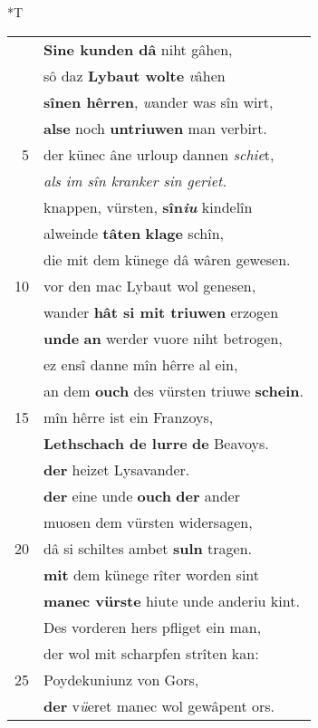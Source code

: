 \documentclass[8pt,a4paper,notitlepage]{article}
\begin{document}
\begin{table}[ht]
\begin{minipage}[t]{0.5\linewidth}
\end{minipage}
\hspace{0.5cm}
\begin{minipage}[t]{0.5\linewidth}
\small
\begin{center}*T
\end{center}
\begin{tabular}{rl}
 & \textbf{Sine kunden dâ} niht gâhen,\\ 
 & sô daz \textbf{Lybaut wolte} \textit{v}âhen\\ 
 & \textbf{sînen hêrren}, \textit{w}ander was sîn wirt,\\ 
 & \textbf{alse} noch \textbf{untriuwen} man verbirt.\\ 
5 & der künec âne urloup dannen \textit{schie}t,\\ 
 & \textit{als im sîn kranker sin geriet.}\\ 
 & knappen, vürsten, \textbf{sîn\textit{iu}} kindelîn\\ 
 & alweinde \textbf{tâten} \textbf{klage} schîn,\\ 
 & die mit dem künege dâ wâren gewesen.\\ 
10 & vor den mac Lybaut wol genesen,\\ 
 & wander \textbf{hât si mit triuwen} erzogen\\ 
 & \textbf{unde} \textbf{an} werder vuore niht betrogen,\\ 
 & ez ensî danne mîn hêrre al ein,\\ 
 & an dem \textbf{ouch} des vürsten triuwe \textbf{schein}.\\ 
15 & mîn hêrre ist ein Franzoys,\\ 
 & \textbf{Lethschach de lurre} \textbf{de} Beavoys.\\ 
 & \textbf{der} heizet Lysavander.\\ 
 & \textbf{der} eine unde \textbf{ouch} \textbf{der} ander\\ 
 & muosen dem vürsten widersagen,\\ 
20 & dâ si schiltes ambet \textbf{suln} tragen.\\ 
 & \textbf{mit} dem künege rîter worden sint\\ 
 & \textbf{manec vürste} hiute unde anderiu kint.\\ 
 & Des vorderen hers pfliget ein man,\\ 
 & der wol mit scharpfen strîten kan:\\ 
25 & Poydekuniunz von Gors,\\ 
 & \textbf{der} v\textit{ü}eret manec wol gewâpent ors.\\ 

\end{tabular}
\end{minipage}
\end{table}
\end{document}
